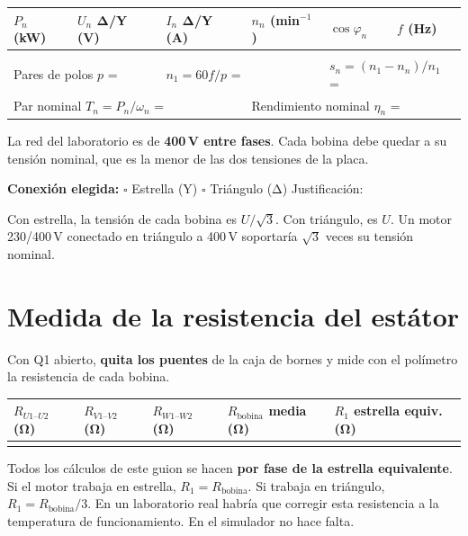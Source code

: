 \documentclass[11pt,a4paper]{article}
\begin{document}
\begin{tabularx}{\textwidth}{|X|X|X|X|X|X|}
  \hline
  $P_n$ (kW) & $U_n$ Δ/Y (V) & $I_n$ Δ/Y (A) & $n_n$ (min$^{-1}$) & $\cos\varphi_n$ & $f$ (Hz) \\ \hline
  & & & & & \\[6pt] \hline
  \multicolumn{2}{|l|}{Pares de polos $p$ =} & \multicolumn{2}{l|}{$n_1 = 60f/p$ =} & \multicolumn{2}{l|}{$s_n = (n_1-n_n)/n_1$ =} \\[4pt] \hline
  \multicolumn{3}{|l|}{Par nominal $T_n = P_n/\omega_n$ =} & \multicolumn{3}{l|}{Rendimiento nominal $\eta_n$ =} \\[4pt] \hline
\end{tabularx}

La red del laboratorio es de \textbf{400\,V entre fases}. Cada bobina debe quedar a su tensión nominal, que es la menor de las dos tensiones de la placa.

\textbf{Conexión elegida:} \quad $\square$ Estrella (Y) \qquad $\square$ Triángulo (Δ) \qquad Justificación: \hrulefill

\vspace{2pt}
\begin{nota}
  Con estrella, la tensión de cada bobina es $U/\sqrt3$. Con triángulo, es $U$. Un motor 230/400\,V conectado en triángulo a 400\,V soportaría $\sqrt3$ veces su tensión nominal.
\end{nota}

\section{Medida de la resistencia del estátor}
Con Q1 abierto, \textbf{quita los puentes} de la caja de bornes y mide con el polímetro la resistencia de cada bobina.

\begin{tabularx}{\textwidth}{|X|X|X|X|X|}
  \hline
  $R_{U1\text{–}U2}$ (Ω) & $R_{V1\text{–}V2}$ (Ω) & $R_{W1\text{–}W2}$ (Ω) & $R_\text{bobina}$ media (Ω) & $R_1$ estrella equiv. (Ω) \\ \hline
  & & & & \\[6pt] \hline
\end{tabularx}

Todos los cálculos de este guion se hacen \textbf{por fase de la estrella equivalente}. Si el motor trabaja en estrella, $R_1 = R_\text{bobina}$. Si trabaja en triángulo, $R_1 = R_\text{bobina}/3$. En un laboratorio real habría que corregir esta resistencia a la temperatura de funcionamiento. En el simulador no hace falta.
\end{document}
